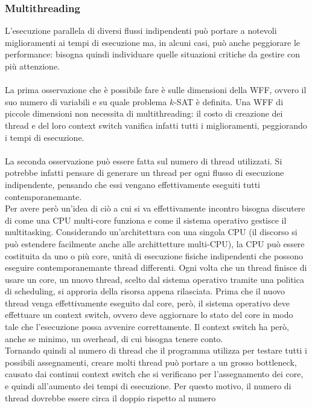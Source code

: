 \subsubsection{Multithreading}
L'esecuzione parallela di diversi flussi indipendenti può portare a notevoli miglioramenti
ai tempi di esecuzione ma, in alcuni casi, può anche peggiorare le performance:
bisogna quindi individuare quelle situazioni critiche da gestire con più attenzione.\\
\\
La prima osservazione che è possibile fare è sulle dimensioni della WFF, ovvero
il suo numero di variabili e su quale problema $k$-SAT è definita.
Una WFF di piccole dimensioni non necessita di multithreading: il costo di creazione dei thread
e del loro context switch vanifica infatti tutti i miglioramenti, peggiorando i tempi di esecuzione.\\
\\
La seconda osservazione può essere fatta sul numero di thread utilizzati.
Si potrebbe infatti pensare di generare un thread per ogni flusso di esecuzione indipendente,
pensando che essi vengano effettivamente eseguiti tutti contemporanemante.\\
Per avere però un'idea di ciò a cui si va effettivamente incontro bisogna discutere di come una CPU multi-core
funziona e come il sistema operativo gestisce il multitasking.
Considerando un'architettura con una singola CPU (il discorso si può estendere facilmente anche
alle archittetture multi-CPU), la CPU può essere costituita da uno o più core, unità
di esecuzione fisiche indipendenti che possono eseguire contemporanemante thread differenti.
Ogni volta che un thread finisce di usare un core, un nuovo thread, scelto dal sistema operativo
tramite una politica di scheduling, si approria della risorsa appena rilasciata. Prima
che il nuovo thread venga effettivamente eseguito dal core, però, il sistema operativo deve effettuare
un context switch, ovvero deve aggiornare lo stato del core in modo tale che l'esecuzione possa avvenire
correttamente. Il context switch ha però, anche se minimo, un overhead, di cui bisogna tenere conto.\\
Tornando quindi al numero di thread che il programma utilizza per testare tutti i possibili assegnamenti, 
creare molti thread può portare a un grosso bottleneck, causato dai continui context switch che si 
verificano per l'assegnamento dei core, e quindi all'aumento dei tempi di esecuzione.
Per questo motivo, il numero di thread dovrebbe essere circa il doppio rispetto al numero
